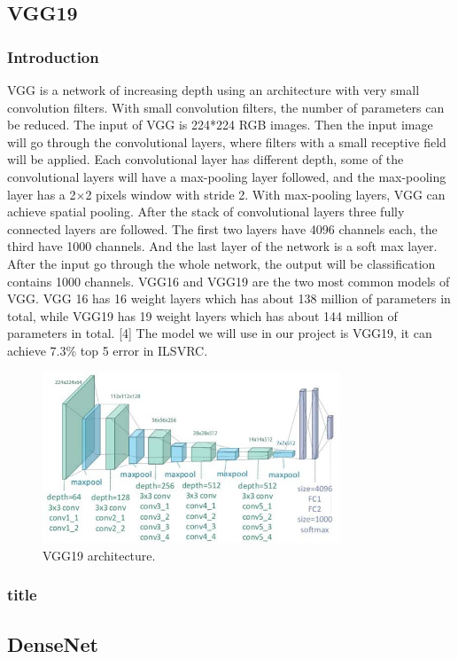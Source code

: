 \documentclass{article}
\begin{document}
\subsection{VGG19}
\subsubsection{Introduction}
VGG is a network of increasing depth using an architecture with very small convolution filters. With small convolution filters, the number of parameters can be reduced. The input of VGG is 224*224 RGB images. Then the input image will go through the convolutional layers, where filters with a small receptive field will be applied. Each convolutional layer has different depth, some of the convolutional layers will have a max-pooling layer followed, and the max-pooling layer has a 2$\times$2 pixels window with stride 2. With max-pooling layers, VGG can achieve spatial pooling. After the stack of convolutional layers three fully connected layers are followed. The first two layers have 4096 channels each, the third have 1000 channels. And the last layer of the network is a soft max layer. After the input go through the whole network, the output will be classification contains 1000 channels. VGG16 and VGG19 are the two most common models of VGG. VGG 16 has 16 weight layers which has about 138 million of parameters in total, while VGG19 has 19 weight layers which has about 144 million of parameters in total. [4] The model we will use in our project is VGG19, it can achieve 7.3\% top 5 error in ILSVRC.

\begin{figure}[H]
	\centering
	\includegraphics[width=3.5in]{pics/vgg} 
	\caption{VGG19 architecture.}
\end{figure}

\subsubsection{title}

\subsection{DenseNet}
\end{document}
